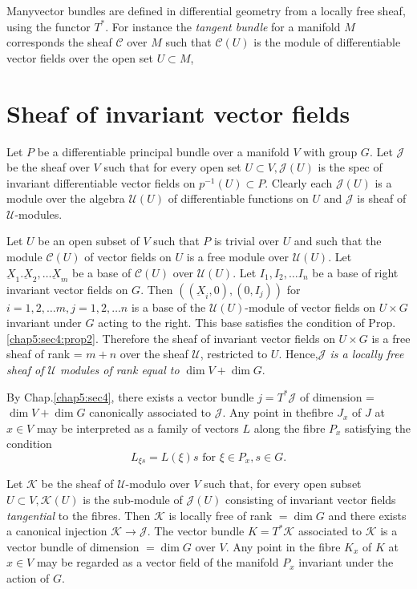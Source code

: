 Many\pageoriginale vector bundles are defined in differential geometry from a
locally free sheaf, using the functor $T^*$. For instance the \textit{
  tangent bundle } for a manifold $M$ corresponds the sheaf
$\mathscr{C}$ over $M$ such that $\mathscr{C}(U)$ is the module of
differentiable vector fields over the open set $U \subset M$, 

\section{Sheaf of invariant vector fields}\label{chap5:sec5}%
   
Let $P$ be a differentiable principal bundle over a manifold $V$ with
group $G$. Let $\mathcal{J}$ be the  sheaf over $V$ such that for
every open set $U \subset V, \mathcal{J} (U)$ is the spec of
invariant differentiable vector fields on $p^{-1}(U) \subset
P$. Clearly each $\mathcal{J}(U)$ is a module over the algebra
$\mathscr{U}(U)$ of differentiable functions on $U$ and $\mathcal{J}$
is sheaf of $\mathscr{U}$-modules. 

Let $U$ be an open subset of $V$ such that $P$ is trivial over $U$ and
such that the module $\mathscr{C}(U)$ of vector fields on $U$ is a
free module over $\mathscr{U} (U)$. Let $\underbar{X}_1.\underbar{X}_2
, \ldots \underbar{X}_m$ be a base of $\mathscr{C}(U)$ over
$\mathscr{U}(U)$. Let $I_1, I_2, \ldots I_n$ be a base of right
invariant vector fields on $G$. Then $((\underbar{X}_i, 0), (0, I_j))$
for $i = 1, 2, \ldots m, j = 1, 2, \ldots n$ is a base of the
$\mathscr{U}(U)$-module of vector fields on $U \times G$ invariant
under $G$ acting to the right. This base satisfies the condition of
Prop.\ref{chap5:sec4:prop2}. 
Therefore the sheaf of invariant vector fields on $U \times G$ is a
free sheaf of rank = $m+n$ over the sheaf $\mathscr{U}$, restricted to
$U$. Hence,\textit{$\mathcal{J}$ is a locally free sheaf of
  $\mathscr{U}$ modules of rank equal to } $\dim V+ \dim G$. 

By Chap.\ref{chap5:sec4}, there exists a vector bundle $j = T^*\mathcal{J}$ of
dimension = $\dim V + \dim G$ canonically associated to
$\mathcal{J}$. Any point in the\pageoriginale fibre $J_x $ of $J$ at $x \in V$ may
be interpreted as a family of vectors $L$ along the fibre $P_x$
satisfying the condition 
$$
L_{\xi s} = L(\xi)s \text{ for } \xi \in P_x , s \in G.
$$

Let $ \mathscr{K}$ be the sheaf of $\mathscr{U}$-modulo over $V$ such
that, for every open subset $U \subset V, \mathscr{K} (U)$ is the
sub-module of $\mathcal{J}(U)$ consisting of invariant vector fields
\textit{tangential } to the fibres. Then $\mathscr{K}$ is locally free
of rank $= \dim G$ and there exists a canonical injection $\mathscr{K}
\to \mathcal{J}$. The vector bundle $K = T^* \mathscr{K}$ associated to
$\mathscr{K}$ is a vector bundle of dimension $= \dim G$ over $V$. Any
point in the fibre $K_x$ of $K$ at $x \in V$ may be regarded as a
vector field of the manifold $P_x$ invariant under the action of $G$. 

